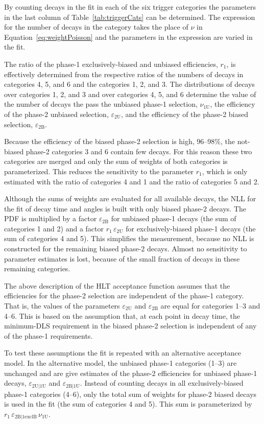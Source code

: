 By counting decays in the fit in each of the six trigger categories the parameters in the last column of Table~\ref{tab:triggerCats} can be
determined. The expression for the number of decays in the category takes the place of $\nu$ in Equation~\ref{eq:weightPoisson} and the
parameters in the expression are varied in the fit.

The ratio of the phase-1 exclusively-biased and unbiased efficiencies, $r_\text{1}$, is effectively determined from the respective ratios
of the numbers of decays in categories 4, 5, and 6 and the categories 1, 2, and 3. The distributions of decays over categories 1, 2, and 3
and over categories 4, 5, and 6 determine the value of the number of decays the pass the unbiased phase-1 selection, $\nu_\text{1U}$, the
efficiency of the phase-2 unbiased selection, $\varepsilon_\text{2U}$, and the efficiency of the  phase-2 biased selection,
$\varepsilon_\text{2B}$.

Because the efficiency of the biased phase-2 selection is high, 96--98\%, the not-biased phase-2 categories 3 and 6 contain few decays. For
this reason these two categories are merged and only the sum of weights of both categories is parameterized. This reduces the sensitivity
to the parameter $r_\text{1}$, which is only estimated with the ratio of categories 4 and 1 and the ratio of categories 5 and 2.

Although the sums of weights are evaluated for all available decays, the NLL for the fit of decay time and angles is built with only biased
phase-2 decays. The PDF is multiplied by a factor $\varepsilon_\text{2B}$ for unbiased phase-1 decays (the sum of categories 1 and 2) and a
factor $r_\text{1}\, \varepsilon_\text{2U}$ for exclusively-biased phase-1 decays (the sum of categories 4 and 5). This simplifies the
measurement, because no NLL is constructed for the remaining biased phase-2 decays. Almost no sensitivity to parameter estimates is lost,
because of the small fraction of decays in these remaining categories.

The above description of the HLT acceptance function assumes that the efficiencies for the phase-2 selection are independent of the phase-1
category. That is, the values of the parameters $\varepsilon_\text{2U}$ and $\varepsilon_\text{2B}$ are equal for categories 1--3 and 4--6.
This is based on the assumption that, at each point in decay time, the minimum-DLS requirement in the biased phase-2 selection is
independent of any of the phase-1 requirements.

To test these assumptions the fit is repeated with an alternative acceptance model. In the alternative model, the unbiased phase-1
categories (1--3) are unchanged and are give estimates of the phase-2 efficiencies for unbiased phase-1 decays, $\varepsilon_\text{2U|1U}$
and $\varepsilon_\text{2B|1U}$. Instead of counting decays in all exclusively-biased phase-1 categories (4--6), only the total sum of
weights for phase-2 biased decays is used in the fit (the sum of categories 4 and 5). This sum is parameterized by
$r_\text{1}\, \varepsilon_\text{2B|1exclB}\, \nu_\text{1U}$.

